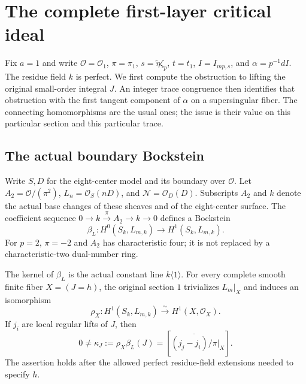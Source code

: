 \section{The complete first-layer critical ideal}
\label{first:section}

Fix $a=1$ and write $\mathcal O=\mathcal O_1$, $\pi=\pi_1$,
$s=\widetilde\eta\zeta_p$, $t=t_1$, $I=I_{mp,s}$, and
$\alpha=p^{-1}dI$. The residue field $k$ is perfect. We first compute
the obstruction to lifting the original small-order integral $J$.
An integer trace congruence then identifies that obstruction with the
first tangent component of $\alpha$ on a supersingular fiber.
The connecting homomorphisms are the usual ones; the issue is their
value on this particular section and this particular trace.

\subsection{The actual boundary Bockstein}

Write $S,D$ for the eight-center model and its boundary over $\mathcal O$.
Let $A_2=\mathcal O/(\pi^2)$, $L_n=\mathcal O_S(nD)$, and
$\mathcal N=\mathcal O_D(D)$. Subscripts $A_2$ and $k$ denote the
actual base changes of these sheaves and of the eight-center surface.
The coefficient sequence $0\to k\xrightarrow{\pi}A_2\to k\to0$
defines a Bockstein
\[
 \beta_L:H^0(S_k,L_{m,k})\longrightarrow H^1(S_k,L_{m,k}).
\]
For $p=2$, $\pi=-2$ and $A_2$ has characteristic four; it is not
replaced by a characteristic-two dual-number ring.

\begin{proposition}
\label{first:obstruction}
The kernel of $\beta_L$ is the actual constant line $k\langle1\rangle$.
For every complete smooth finite fiber $X=(J=h)$, the original section
$1$ trivializes $L_m|_X$ and induces an isomorphism
\[
 \rho_X:H^1(S_k,L_{m,k})\xrightarrow{\sim}H^1(X,\mathcal O_X).
\]
If $j_i$ are local regular lifts of $J$, then
\begin{equation}
 0\ne\kappa_J:=\rho_X\beta_L(J)
 =\left[\overline{(j_j-j_i)/\pi}\big|_X\right].
 \label{first:kappa}
\end{equation}
The assertion holds after the allowed perfect residue-field extensions
needed to specify $h$.
\end{proposition}

